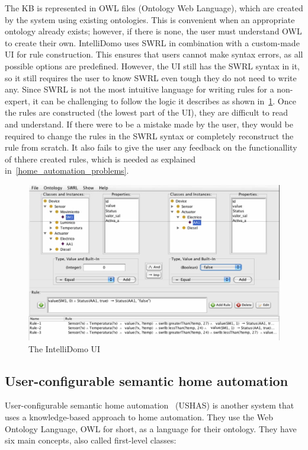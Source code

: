 \documentclass[11pt,a4paper]{report}
\begin{document}
The KB is represented in OWL files (Ontology Web Language), which are created by the system using existing ontologies. This is convenient when an appropriate ontology already exists; however, if there is none, the user must understand OWL to create their own. IntelliDomo uses SWRL in combination with a custom-made UI for rule construction. This ensures that users cannot make syntax errors, as all possible options are predefined. However, the UI still has the SWRL syntax in it, so it still requires the user to know SWRL even tough they do not need to write any. Since SWRL is not the most intuitive language for writing rules for a non-expert, it can be challenging to follow the logic it describes as shown in~\ref{fig:IntelliDomo_UI}. Once the rules are constructed (the lowest part of the UI), they are difficult to read and understand. If there were to be a mistake made by the user, they would be required to change the rules in the SWRL syntax or completely reconstruct the rule from scratch. It also fails to give the user any feedback on the functionallity of thhere created rules, which is needed as explained in~\ref{home_automation_problems}. 

\begin{figure}
    \centering
    \includegraphics[width=0.8\linewidth]{images/IntelliDomo_UI.png}
    \caption{The IntelliDomo UI~\cite{SOTA_OntologyBased}}
    \label{fig:IntelliDomo_UI}
\end{figure}

\subsection{User-configurable semantic home automation}
\label{USHAS}
User-configurable semantic home automation~\cite{SOTA_AutomationConfigurationSmarthome} (USHAS) is another system that uses a knowledge-based approach to home automation. They use the Web Ontology Language, OWL for short, as a language for their ontology. They have six main concepts, also called first-level classes:
\end{document}
